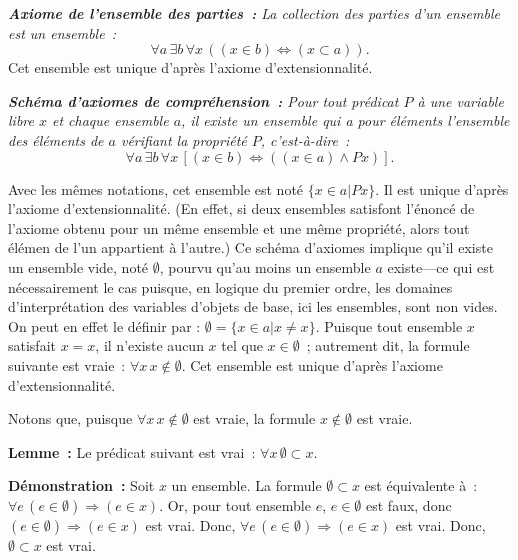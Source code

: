     \done

\medskip

\noindent\textit{\textbf{Axiome de l'ensemble des parties :} La collection des parties d'un ensemble est un ensemble :} 
\begin{equation*}
    \forall a \, \exists b \, \forall x \, (
        (x \in b) \Leftrightarrow (x \subset a)
    ).
\end{equation*}
Cet ensemble est unique d'après l'axiome d'extensionnalité.

\medskip

\noindent\textit{\textbf{Schéma d'axiomes de compréhension :} 
Pour tout prédicat $P$ à une variable libre $x$ et chaque ensemble $a$, il existe un ensemble qui a pour éléments l'ensemble des éléments de $a$ vérifiant la propriété $P$, c'est-à-dire :}
\begin{equation*}
\forall a \, \exists b \, \forall x \, [ (x \in b) \Leftrightarrow ((x \in a) \wedge P x)]. 
\end{equation*}

Avec les mêmes notations, cet ensemble est noté $\lbrace x \in a \vert P x \rbrace$. 
Il est unique d'après l'axiome d'extensionnalité. 
(En effet, si deux ensembles satisfont l'énoncé de l'axiome obtenu pour un même ensemble et une même propriété, alors tout élémen de l'un appartient à l'autre.)
Ce schéma d'axiomes implique qu'il existe un ensemble vide, noté $\emptyset$, pourvu qu'au moins un ensemble $a$ existe—ce qui est nécessairement le cas puisque, en logique du premier ordre, les domaines d'interprétation des variables d'objets de base, ici les ensembles, sont non vides. 
On peut en effet le définir par : $\emptyset = \lbrace x \in a \vert x \neq x \rbrace$. 
Puisque tout ensemble $x$ satisfait $x = x$, il n'existe aucun $x$ tel que $x \in \emptyset$ ; autrement dit, la formule suivante est vraie : $\forall x \, x \notin \emptyset$. 
Cet ensemble est unique d'après l'axiome d'extensionnalité.

Notons que, puisque $\forall x \, x \notin \emptyset$ est vraie, la formule $x \notin \emptyset$ est vraie.

\medskip

\noindent\textbf{Lemme :} Le prédicat suivant est vrai : $\forall x \, \emptyset \subset x$.

\medskip

\noindent\textbf{Démonstration :} Soit $x$ un ensemble. 
    La formule $\emptyset \subset x$ est équivalente à : $\forall e \, (e \in \emptyset) \Rightarrow (e \in x)$. 
    Or, pour tout ensemble $e$, $e \in \emptyset$ est faux, donc $(e \in \emptyset) \Rightarrow (e \in x)$ est vrai.
    Donc, $\forall e \, (e \in \emptyset) \Rightarrow (e \in x)$ est vrai. 
    Donc, $\emptyset \subset x$ est vrai.

